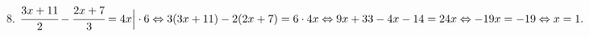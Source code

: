 8. $\cfrac{3x+11}{2}-\cfrac{2x+7}{3}=4x\Big|\cdot6\Leftrightarrow3(3x+11)-2(2x+7)=6\cdot4x\Leftrightarrow9x+33-4x-14=24x\Leftrightarrow-19x=-19\Leftrightarrow x=1.$\\
